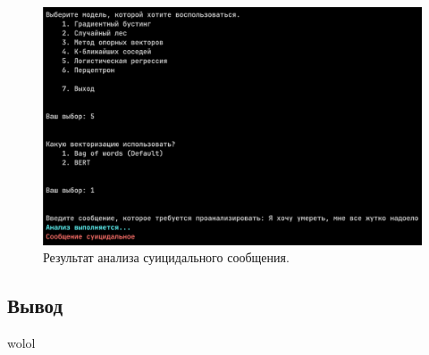 \begin{figure}[H]
	\centering
	\includegraphics[width=\textwidth]{inc/utility2.png}
	\caption{ Результат анализа суицидального сообщения. }
	\label{img:utility2}
\end{figure}

\subsection*{Вывод}

wolol